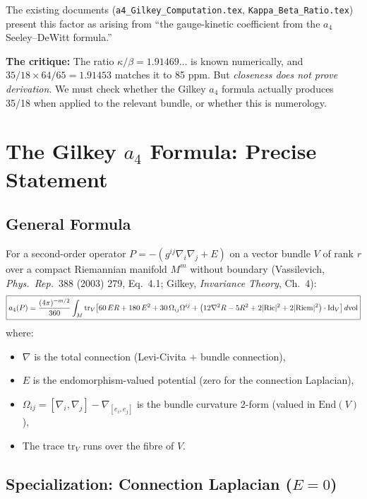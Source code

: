 \documentclass[12pt,a4paper]{article}
\theoremstyle{definition}
\begin{document}
The existing documents (\texttt{a4\_Gilkey\_Computation.tex},
\texttt{Kappa\_Beta\_Ratio.tex}) present this factor as arising from
``the gauge-kinetic coefficient from the $a_4$ Seeley--DeWitt formula.''

\textbf{The critique:} The ratio $\kappa/\beta = 1.91469\ldots$ is
known numerically, and $35/18 \times 64/65 = 1.91453$ matches it
to 85 ppm.  But \emph{closeness does not prove derivation}.  We must
check whether the Gilkey $a_4$ formula actually produces 35/18 when
applied to the relevant bundle, or whether this is numerology.

\section{The Gilkey $a_4$ Formula: Precise Statement}
\label{sec:gilkey}

\subsection{General Formula}

For a second-order operator $P = -(g^{ij}\nabla_i\nabla_j + E)$ on a
vector bundle $V$ of rank $r$ over a compact Riemannian manifold $M^m$
without boundary (Vassilevich, \textit{Phys.\ Rep.}\ 388 (2003) 279,
Eq.~4.1; Gilkey, \textit{Invariance Theory}, Ch.~4):
\begin{equation}\label{eq:a4-general}
\boxed{
a_4(P) = \frac{(4\pi)^{-m/2}}{360}\int_M \mathrm{tr}_V\!\left[
60\,ER + 180\,E^2 + 30\,\Omega_{ij}\Omega^{ij}
+ \bigl(12\nabla^2 R - 5R^2 + 2|{\rm Ric}|^2 + 2|{\rm Riem}|^2\bigr)
\cdot\mathrm{Id}_V
\right]d\mathrm{vol}
}
\end{equation}
where:
\begin{itemize}
\item $\nabla$ is the total connection (Levi-Civita $+$ bundle connection),
\item $E$ is the endomorphism-valued potential (zero for the connection Laplacian),
\item $\Omega_{ij} = [\nabla_i, \nabla_j] - \nabla_{[e_i, e_j]}$ is
  the bundle curvature 2-form (valued in $\mathrm{End}(V)$),
\item The trace $\mathrm{tr}_V$ runs over the fibre of $V$.
\end{itemize}

\subsection{Specialization: Connection Laplacian ($E = 0$)}
\end{document}
